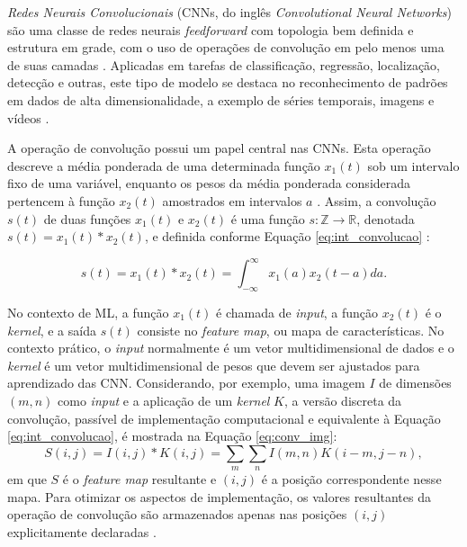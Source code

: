 \emph{Redes Neurais Convolucionais} (CNNs, do inglês \emph{Convolutional Neural Networks}) são uma classe de redes neurais \emph{feedforward} com topologia bem definida e estrutura em grade, com o uso de operações de convolução em pelo menos uma de suas camadas \cite{goodfellow2016deep}. Aplicadas em tarefas de classificação, regressão, localização, detecção e outras, este tipo de modelo se destaca no reconhecimento de padrões em dados de alta dimensionalidade, a exemplo de séries temporais, imagens e vídeos \cite{Khan:Livro}.

A operação de convolução possui um papel central nas CNNs. Esta operação descreve a média ponderada de uma determinada função $x_1(t)$ sob um intervalo fixo de uma variável, enquanto os pesos da média ponderada considerada pertencem à função $x_2(t)$ amostrados em intervalos $a$ \cite{bracewell1986fourier}. Assim, a convolução $s(t)$ de duas funções $x_1(t)$ e $x_2(t)$ é uma função $s: \mathds{Z} \rightarrow \mathds{R}$, denotada $s(t) = x_1(t) * x_2(t)$, e definida conforme Equação \ref{eq:int_convolucao} \cite{lathi2006sinais}:

\begin{equation}\label{eq:int_convolucao}
s(t) = x_1(t) * x_2(t) = \int_{-\infty}^{\infty} x_1(a) x_2(t-a)da.
\end{equation}

No contexto de ML, a função $x_1(t)$ é chamada de \emph{input}, a função $x_2(t)$ é o \emph{kernel}, e a saída $s(t)$ consiste no \emph{feature map}, ou mapa de características. No contexto prático, o \emph{input} normalmente é um vetor multidimensional de dados e o \emph{kernel} é um vetor multidimensional de pesos que devem ser ajustados para aprendizado das CNN. Considerando, por exemplo, uma imagem $I$ de dimensões $(m,n)$ como \emph{input} e a aplicação de um \emph{kernel} $K$, a versão discreta da convolução, passível de implementação computacional e equivalente à Equação \ref{eq:int_convolucao}, é mostrada na Equação \ref{eq:conv_img}:
\begin{equation}
 S(i,j) = I(i,j)*K(i,j) = \sum_{m}\sum_{n}I(m,n)K(i-m,j-n),\label{eq:conv_img}
\end{equation}
em que $S$ é o \emph{feature map} resultante e $(i,j)$ é a posição correspondente nesse mapa. Para otimizar os aspectos de implementação, os valores resultantes da operação de convolução são armazenados apenas nas posições $(i,j)$ explicitamente declaradas \cite{goodfellow2016deep}.

